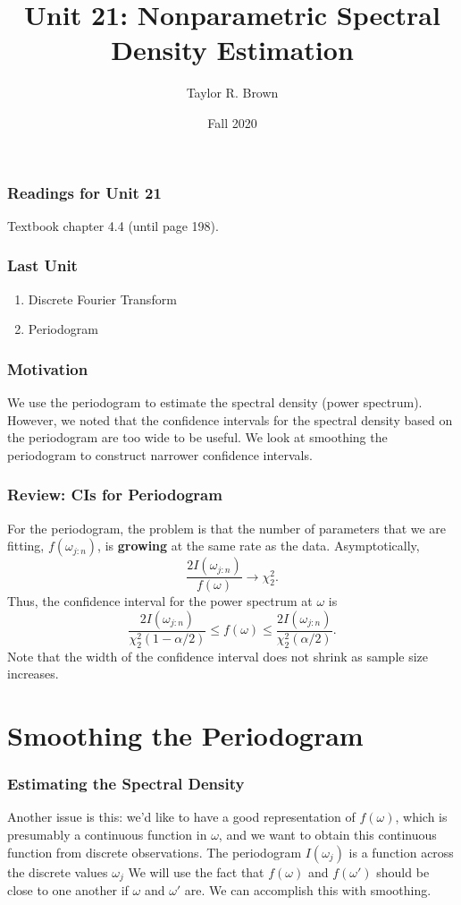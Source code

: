 \documentclass[%
xcolor=pdftex]{beamer}
\title{Unit 21: Nonparametric Spectral Density Estimation}
\author[STAT 5170: Applied Time Series, Unit 21]{Taylor R. Brown}
\institute{Department of Statistics, University of Virginia}
\date{Fall 2020}
\begin{document}
\frame{\titlepage}


\begin{frame}
\frametitle{Readings for Unit 21}

Textbook chapter 4.4 (until page 198).

\end{frame}


\begin{frame}
\frametitle{Last Unit}
\begin{enumerate}
\item Discrete Fourier Transform
\item Periodogram
\end{enumerate}
\end{frame}

\begin{frame}
\frametitle{Motivation}

We use the periodogram to estimate the spectral density (power spectrum). However, we noted that the confidence intervals for the spectral density based on the periodogram are too wide to be useful. We look at smoothing the periodogram to construct narrower confidence intervals.


\end{frame}

\begin{frame}
\frametitle{Review: CIs for Periodogram}

For the periodogram,  the problem is that the number of parameters that we are fitting, $f(\omega_{j:n})$, is \textbf{growing} at the same rate as the data. Asymptotically,
$$
\frac{2 I(\omega_{j:n}) }{f(\omega)} \rightarrow \chi_2^2.
$$
Thus, the confidence interval for the power spectrum at $\omega$ is
$$
\frac{2 I(\omega_{j:n}) }{\chi_2^2(1-\alpha/2)} \leq f(\omega) \leq \frac{2 I(\omega_{j:n}) }{\chi_2^2(\alpha/2)}.
$$
Note that the width of the confidence interval does not shrink as sample size increases.

\end{frame}





\section{Smoothing the Periodogram}
\frame{\tableofcontents[currentsection]}

\begin{frame}
\frametitle{Estimating the Spectral Density}

Another issue is this: we'd like to have a
good representation of $f(\omega)$, which is presumably a
continuous function in $\omega$, and we want to obtain this
continuous function from discrete observations. The periodogram $I(\omega_j)$ is a function across the discrete
values $\omega_j$  We will use the fact that $f(\omega)$
and $f(\omega')$ should be close to one another if $\omega$ and
$\omega'$ are.  We can accomplish this with smoothing.

\end{frame}
\end{document}
